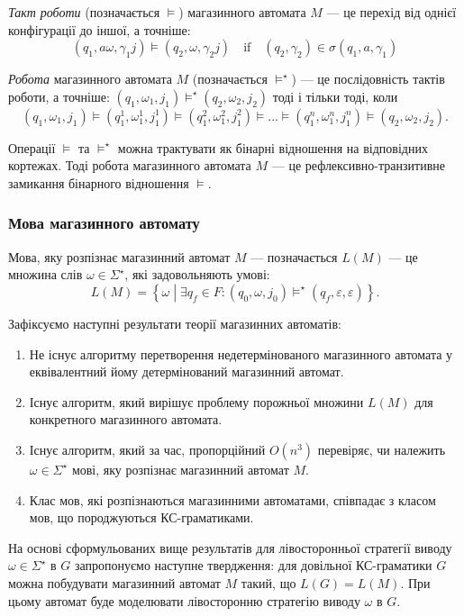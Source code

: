 \textit{Такт роботи} (позначається $\models$) магазинного автомата $M$ --- це перехід від однієї конфігурації до іншої, а точніше:
\[ (q_1, a \omega, \gamma_1 j) \models (q_2, \omega, \gamma_2 j) \quad\text{if}\quad (q_2, \gamma_2) \in \sigma(q_1, a, \gamma_1)\]

\textit{Робота} магазинного автомата $M$ (позначається $\models^\star$) --- це послідовність тактів роботи, а точніше: $(q_1, \omega_1, j_1) \models^\star (q_2, \omega_2, j_2)$ тоді і тільки тоді, коли
\[ (q_1, \omega_1, j_1) \models (q_1^1, \omega_1^1, j_1^1) \models (q_1^2, \omega_1^2, j_1^2) \models \ldots \models (q_1^n, \omega_1^n, j_1^n) \models (q_2, \omega_2, j_2). \]

Операції $\models$ та $\models^\star$ можна трактувати як бінарні відношення на відповідних кортежах. Тоді робота магазинного автомата $M$ --- це рефлексивно-транзитивне замикання бінарного відношення $\models$.

\subsubsection{Мова магазинного автомату}

Мова, яку розпізнає магазинний автомат $M$ --- позначається $L(M)$ --- це множина слів $\omega \in \Sigma^\star$, які задовольняють умові:
\[ L(M) = \left\{ \omega \middle| \exists q_f \in F: (q_0, \omega, j_0) \models^\star (q_f, \varepsilon, \varepsilon) \right\}.\]

Зафіксуємо наступні результати теорії магазинних автоматів:
\begin{enumerate}
	\item Не існує алгоритму перетворення недетермінованого магазинного автомата у еквівалентний йому детермінований магазинний автомат.
	\item Існує алгоритм, який вирішує проблему порожньої множини $L(M)$ для конкретного магазинного автомата.
	\item Існує алгоритм, який за час, пропорційний $O(n^3)$ перевіряє, чи належить $\omega \in \Sigma^\star$ мові, яку розпізнає магазинний автомат $M$.
	\item Клас мов, які розпізнаються магазинними автоматами, співпадає з класом мов, що породжуються КС-граматиками.
\end{enumerate}

На основі сформульованих вище результатів для лівосторонньої стратегії виводу $\omega \in \Sigma^\star$ в $G$ запропонуємо наступне твердження: для довільної КС-граматики $G$ можна побудувати магазинний автомат $M$ такий, що $L(G) = L(M)$. При цьому автомат буде моделювати лівосторонню стратегію виводу $\omega$ в $G$.

